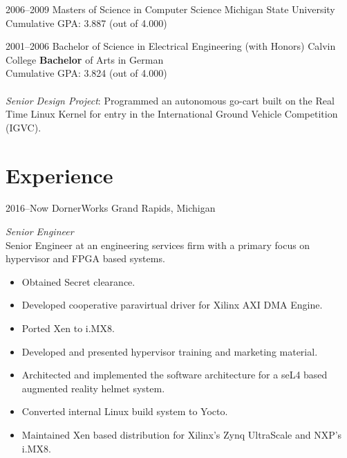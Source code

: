\documentclass[print]{template/friggeri-cv} %
\begin{document}
\begin{entrylist}

\entry
{2006--2009}
{Masters {\normalfont of Science in Computer Science}}
{Michigan State University}
{Cumulative GPA:  3.887 (out of 4.000)}

\entry
{2001--2006}
{Bachelor {\normalfont of Science in Electrical Engineering (with Honors)}}
{Calvin College}
{\textbf{Bachelor} of Arts in German \\
Cumulative GPA:  3.824 (out of 4.000) \\
\\
\emph{Senior Design Project}: Programmed an autonomous go-cart built on the Real
Time Linux Kernel for entry in the International Ground Vehicle Competition (IGVC).}

\end{entrylist}

\section{Experience}

\begin{entrylist}

\entry
{2016--Now}
{DornerWorks}
{Grand Rapids, Michigan}
{\emph{Senior Engineer} \\
Senior Engineer at an engineering services firm with a primary focus on hypervisor and FPGA based systems.
\begin{itemize}
\item Obtained Secret clearance.
\item Developed cooperative paravirtual driver for Xilinx AXI DMA Engine.
\item Ported Xen to i.MX8.
\item Developed and presented hypervisor training and marketing material.
\item Architected and implemented the software architecture for a seL4 based augmented reality helmet system.
\item Converted internal Linux build system to Yocto.
\item Maintained Xen based distribution for Xilinx's Zynq UltraScale and NXP's i.MX8.
\end{itemize}}

\end{entrylist}
\end{document}
